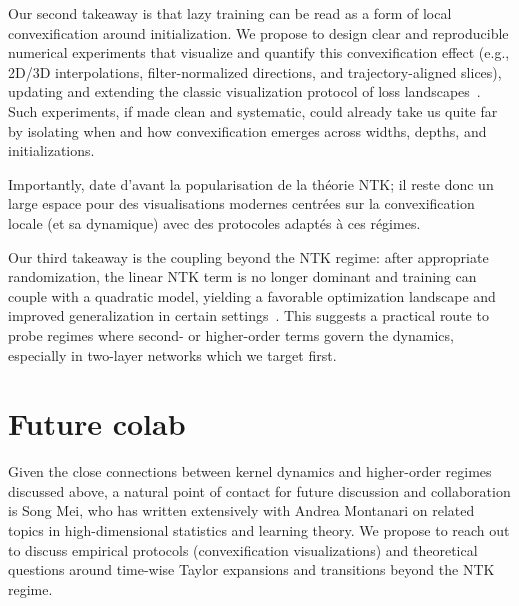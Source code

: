 \documentclass[12pt]{article}
\begin{document}
Our second takeaway is that lazy training can be read as a form of local convexification around initialization. We propose to design clear and reproducible numerical experiments that visualize and quantify this convexification effect (e.g., 2D/3D interpolations, filter-normalized directions, and trajectory-aligned slices), updating and extending the classic visualization protocol of loss landscapes~\cite{li2018visualizinglosslandscapeneural}. Such experiments, if made clean and systematic, could already take us quite far by isolating when and how convexification emerges across widths, depths, and initializations.

Importantly, \cite{li2018visualizinglosslandscapeneural} date d'avant la popularisation de la théorie NTK; il reste donc un large espace pour des visualisations modernes centrées sur la convexification locale (et sa dynamique) avec des protocoles adaptés à ces régimes.

Our third takeaway is the coupling beyond the NTK regime: after appropriate randomization, the linear NTK term is no longer dominant and training can couple with a quadratic model, yielding a favorable optimization landscape and improved generalization in certain settings~\cite{bai2020beyond}. This suggests a practical route to probe regimes where second- or higher-order terms govern the dynamics, especially in two-layer networks which we target first.

\section{Future colab}\label{sec:future-colab}
Given the close connections between kernel dynamics and higher-order regimes discussed above, a natural point of contact for future discussion and collaboration is Song Mei, who has written extensively with Andrea Montanari on related topics in high-dimensional statistics and learning theory. We propose to reach out to discuss empirical protocols (convexification visualizations) and theoretical questions around time-wise Taylor expansions and transitions beyond the NTK regime.
\end{document}
